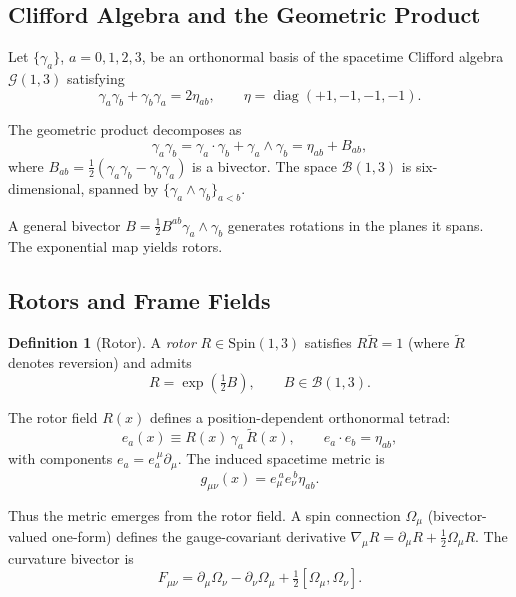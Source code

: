 \documentclass[11pt,a4paper]{article}
\numberwithin{equation}{section}
\theoremstyle{plain}
\theoremstyle{definition}
\newtheorem{definition}[theorem]{Definition}
\theoremstyle{remark}
\DeclareMathOperator{\diag}{diag}
\newcommand{\Spin}{\mathrm{Spin}}
\newcommand{\Cl}{\mathcal{G}}               %
\newcommand{\rev}[1]{\widetilde{#1}}        %
\newcommand{\bivec}{\mathcal{B}}            %
\newcommand{\Curv}{F_{\mu\nu}}              %
\begin{document}
\subsection{Clifford Algebra and the Geometric Product}

Let $\{\gamma_a\}$, $a=0,1,2,3$, be an orthonormal basis of the spacetime Clifford algebra $\Cl(1,3)$ satisfying
\begin{equation}
\gamma_a\gamma_b+\gamma_b\gamma_a=2\eta_{ab},\qquad \eta=\diag(+1,-1,-1,-1).
\end{equation}

The geometric product decomposes as
\begin{equation}
\gamma_a\gamma_b = \gamma_a\cdot\gamma_b + \gamma_a\wedge\gamma_b = \eta_{ab} + B_{ab},
\end{equation}
where $B_{ab}=\tfrac12(\gamma_a\gamma_b-\gamma_b\gamma_a)$ is a bivector. The space $\bivec(1,3)$ is six-dimensional, spanned by $\{\gamma_a\wedge\gamma_b\}_{a<b}$.

A general bivector $B=\tfrac12 B^{ab}\gamma_a\wedge\gamma_b$ generates rotations in the planes it spans. The exponential map yields rotors.

\subsection{Rotors and Frame Fields}

\begin{definition}[Rotor]
A \emph{rotor} $R\in\Spin(1,3)$ satisfies $R\rev{R}=1$ (where $\rev{R}$ denotes reversion) and admits
\begin{equation}
R=\exp\!\left(\tfrac12 B\right), \qquad B\in\bivec(1,3).
\end{equation}
\end{definition}

The rotor field $R(x)$ defines a position-dependent orthonormal tetrad:
\begin{equation}
e_a(x) \equiv R(x)\,\gamma_a\,\rev{R}(x), \qquad e_a\cdot e_b=\eta_{ab},
\end{equation}
with components $e_a=e_a^{\ \mu}\partial_\mu$. The induced spacetime metric is
\begin{equation}
g_{\mu\nu}(x)=e_\mu^{\ a}e_\nu^{\ b}\eta_{ab}.
\label{eq:metric-tetrad}
\end{equation}

Thus the metric emerges from the rotor field. A spin connection $\Omega_\mu$ (bivector-valued one-form) defines the gauge-covariant derivative $\nabla_\mu R=\partial_\mu R+\tfrac12 \Omega_\mu R$. The curvature bivector is
\begin{equation}
\Curv=\partial_\mu\Omega_\nu-\partial_\nu\Omega_\mu+\tfrac12[\Omega_\mu,\Omega_\nu].
\end{equation}
\end{document}
